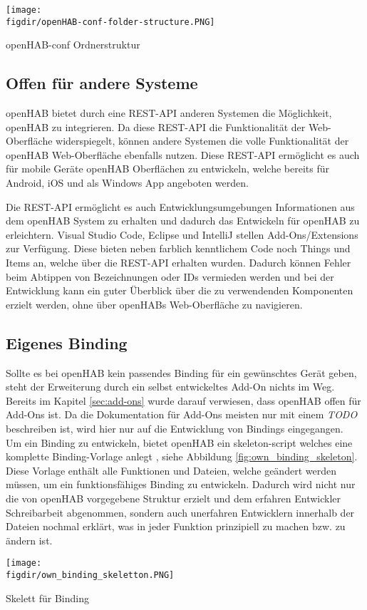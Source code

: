 {
	\centering
	\captionsetup{type=figure}
	\texttt{[image: \\figdir/openHAB-conf-folder-structure.PNG]}
	\caption{openHAB-conf Ordnerstruktur \label{fig:openHAB-conf-folder-structure}}
}

\subsection{Offen für andere Systeme}
openHAB bietet durch eine REST-API anderen Systemen die Möglichkeit, openHAB zu integrieren. Da diese REST-API die Funktionalität der Web-Oberfläche widerspiegelt, können andere Systemen die volle Funktionalität der openHAB Web-Oberfläche ebenfalls nutzen. Diese REST-API ermöglicht es auch für mobile Geräte openHAB Oberflächen zu entwickeln, welche bereits für Android, iOS und als Windows App angeboten werden.

Die REST-API ermöglicht es auch Entwicklungsumgebungen Informationen aus dem openHAB System zu erhalten und dadurch das Entwickeln für openHAB zu erleichtern. Visual Studio Code, Eclipse und IntelliJ stellen Add-Ons/Extensions zur Verfügung. Diese bieten neben farblich kenntlichem Code noch Things und Items an, welche über die REST-API erhalten wurden. Dadurch können Fehler beim Abtippen von Bezeichnungen oder IDs vermieden werden und bei der Entwicklung kann ein guter Überblick über die zu verwendenden Komponenten erzielt werden, ohne über openHABs Web-Oberfläche zu navigieren.

\subsection{Eigenes Binding}
Sollte es bei openHAB kein passendes Binding für ein gewünschtes Gerät geben, steht der Erweiterung durch ein selbst entwickeltes Add-On nichts im Weg. Bereits im Kapitel \ref{sec:add-ons} wurde darauf verwiesen, dass openHAB offen für Add-Ons ist. Da die Dokumentation für Add-Ons meisten nur mit einem \textit{TODO} beschreiben ist, wird hier nur auf die Entwicklung von Bindings eingegangen.\\
Um ein Binding zu entwickeln, bietet openHAB ein skeleton-script welches eine komplette Binding-Vorlage anlegt \cite{openHAB05:OH}, siehe Abbildung \ref{fig:own_binding_skeleton}. Diese Vorlage enthält alle Funktionen und Dateien, welche geändert werden müssen, um ein funktionsfähiges Binding zu entwickeln. Dadurch wird nicht nur die von openHAB vorgegebene Struktur erzielt und dem erfahren Entwickler Schreibarbeit abgenommen, sondern auch unerfahren Entwicklern innerhalb der Dateien nochmal erklärt, was in jeder Funktion prinzipiell zu machen bzw. zu ändern ist.
\smallskip
{
	\centering
	\captionsetup{type=figure}
	\texttt{[image: \\figdir/own\_binding\_skeletton.PNG]}
	\caption{Skelett für Binding \label{fig:own_binding_skeleton}}
}

